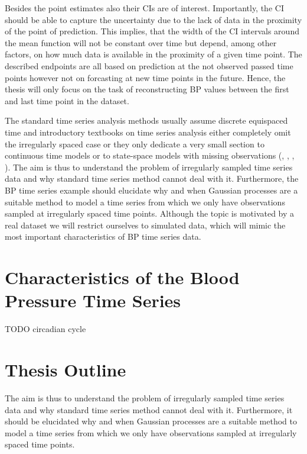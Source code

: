 Besides the point estimates also their CIs are of interest.
Importantly, the CI should be able to capture the uncertainty due to the lack of data in the proximity of the point of prediction.
This implies, that the width of the CI intervals around the mean function will not be constant over time but depend, among
other factors, on how much data is available in the proximity of a given time point.
The described endpoints are all based on prediction at the not observed passed time points however not on forcasting at new time points in
the future.
Hence, the thesis will only focus on the task of reconstructing BP values between the first and last time point in the dataset.

The standard time series analysis methods usually assume discrete equispaced
time and introductory textbooks on time series analysis either completely omit
the irregularly spaced case or they only dedicate
a very small section to continuous time models or to state-space models
with missing observations (\citeauthor{brockwell_time_1991}, \citeauthor{brockwell_introduction_2016},
\citeauthor{cryer_time_2008}, \citeauthor{chatfield_analysis_2003}).
The aim is thus to understand the problem of irregularly sampled time series data
and why standard time series method cannot deal with it.
Furthermore, the BP time series example should elucidate why and when Gaussian processes are a
suitable method to model a time series from which we only have observations sampled at
irregularly spaced time points.
Although the topic is motivated by a real dataset we will restrict ourselves to simulated data,
which will mimic the most important characteristics of BP time series data.

\section{Characteristics of the Blood Pressure Time Series}\label{sec:characteristics-of-the-blood-pressure-time-series}
TODO
circadian cycle



\section{Thesis Outline}

The aim is thus to understand the problem of irregularly sampled time series data
and why standard time series method cannot deal with it.
Furthermore, it should be elucidated why and when Gaussian processes are a
suitable method to model a time series from which we only have observations sampled at
irregularly spaced time points.










